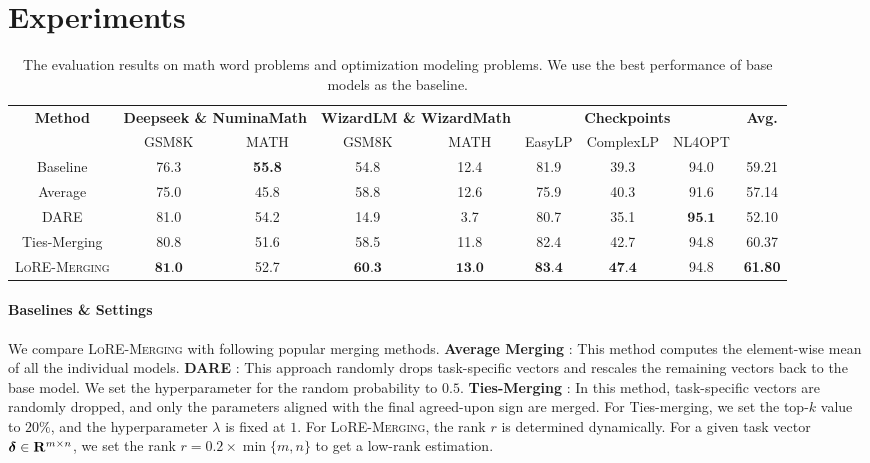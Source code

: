 \section{Experiments} \label{sec:exp}

\begin{table*}[htbp]
\fontsize{8.5}{9} \selectfont
\begin{center}
\begin{tabular}{c | c c| c c |  c c c | c}
\toprule
\multirow{2}{*}{\textbf{Method}} & \multicolumn{2}{c|}{\textbf{Deepseek \& NuminaMath}} & \multicolumn{2}{c|}{\textbf{WizardLM \& WizardMath}} & \multicolumn{3}{c|}{\textbf{Checkpoints}} & \multirow{2}{*}{\textbf{Avg.}} \\
 \cline{2-3} \cline{4-5} \cline{6-8}
 & {GSM8K} & {MATH} & {GSM8K} & {MATH} & {EasyLP} & {ComplexLP} & {NL4OPT}  \\
\hline
Baseline & 76.3 & \textbf{55.8} & 54.8 & 12.4 & 81.9 & 39.3 & 94.0 & 59.21 \\ 
Average & 75.0 & 45.8 & 58.8 & 12.6 & 75.9 & 40.3 & 91.6 & 57.14  \\ 
DARE & 81.0 &  54.2 & 14.9 & 3.7 & 80.7 & 35.1 & $\textbf{95.1}$ & 52.10 \\ 
Ties-Merging & 80.8 & 51.6 & 58.5 & 11.8 & 82.4 & 42.7 & 94.8 & 60.37\\
\hdashline
{\textsc{LoRE-Merging}} & $\textbf{81.0}$ & 52.7 & $\textbf{60.3}$ & $\textbf{13.0}$ & $\textbf{83.4}$ & $\textbf{47.4}$ & 94.8 & \textbf{61.80} \\ 
\bottomrule
\end{tabular}
\caption{The evaluation results on math word problems and optimization modeling problems. We use the best performance of base models as the baseline.}
\label{table:1}
\end{center}
\vspace{-3mm}
\end{table*}

\paragraph{Baselines \& Settings}
We compare \textsc{LoRE-Merging} with following popular merging methods.
{\textbf{Average Merging}} \citep{choshen_2022_fusing}: This method computes the element-wise mean of all the individual models.
{\textbf{DARE}} \citep{yu_2024_language}: This approach randomly drops task-specific vectors and rescales the remaining vectors back to the base model. We set the hyperparameter for the random probability to $0.5$.
{\textbf{Ties-Merging}} \citep{yadav_2024_ties}: In this method, task-specific vectors are randomly dropped, and only the parameters aligned with the final agreed-upon sign are merged. For Ties-merging, we set the top-$k$ value to $20 \%$, and the hyperparameter $\lambda$ is fixed at $1$.
For \textsc{LoRE-Merging}, the rank $r$ is determined dynamically. 
For a given task vector $\bm{\delta} \in \mathbf{R}^{m \times n}$, we set the rank $r = 0.2 \times \min \{ m, n \}$ to get a low-rank estimation.

